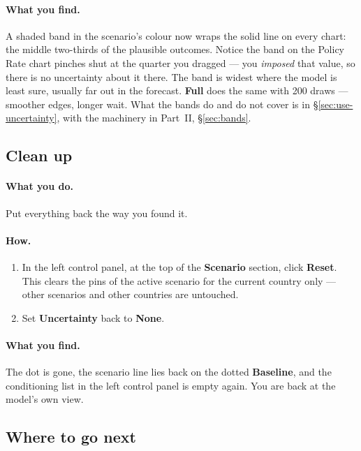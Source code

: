 \documentclass[11pt]{article}
\theoremstyle{definition}
\theoremstyle{remark}
\begin{document}
\paragraph{What you find.} A shaded band in the scenario's colour now wraps the
solid line on every chart: the middle two-thirds of the plausible outcomes.
Notice the band on the Policy Rate chart pinches shut at the quarter you dragged
--- you \emph{imposed} that value, so there is no uncertainty about it there. The
band is widest where the model is least sure, usually far out in the forecast.
\textbf{Full} does the same with 200 draws --- smoother edges, longer wait.
What the bands do and do not cover is in \S\ref{sec:use-uncertainty}, with the
machinery in Part~II, \S\ref{sec:bands}.

\subsection{Clean up}

\paragraph{What you do.} Put everything back the way you found it.

\paragraph{How.}
\begin{enumerate}
  \item In the left control panel, at the top of the \textbf{Scenario} section,
    click \textbf{Reset}. This clears the pins of the active scenario for the
    current country only --- other scenarios and other countries are untouched.
  \item Set \textbf{Uncertainty} back to \textbf{None}.
\end{enumerate}

\paragraph{What you find.} The dot is gone, the scenario line lies back on the
dotted \textbf{Baseline}, and the conditioning list in the left control panel is
empty again. You are back at the model's own view.

\subsection{Where to go next}
\end{document}
